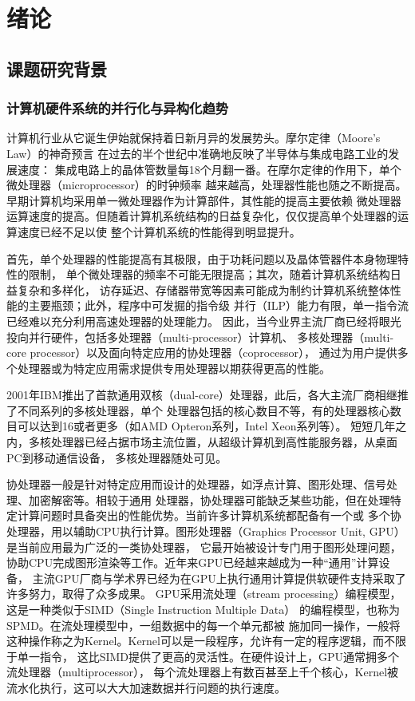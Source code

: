 \chapter{绪论}

\section{课题研究背景}

\subsection{计算机硬件系统的并行化与异构化趋势}
计算机行业从它诞生伊始就保持着日新月异的发展势头。摩尔定律（Moore's Law）的神奇预言
在过去的半个世纪中准确地反映了半导体与集成电路工业的发展速度：
集成电路上的晶体管数量每18个月翻一番。在摩尔定律的作用下，单个微处理器（microprocessor）的时钟频率
越来越高，处理器性能也随之不断提高。早期计算机均采用单一微处理器作为计算部件，其性能的提高主要依赖
微处理器运算速度的提高。但随着计算机系统结构的日益复杂化，仅仅提高单个处理器的运算速度已经不足以使
整个计算机系统的性能得到明显提升。

首先，单个处理器的性能提高有其极限，由于功耗问题以及晶体管器件本身物理特性的限制，
单个微处理器的频率不可能无限提高；其次，随着计算机系统结构日益复杂和多样化，
访存延迟、存储器带宽等因素可能成为制约计算机系统整体性能的主要瓶颈；此外，程序中可发掘的指令级
并行（ILP）能力有限，单一指令流已经难以充分利用高速处理器的处理能力。
因此，当今业界主流厂商已经将眼光投向并行硬件，包括多处理器（multi-processor）计算机、
多核处理器（multi-core processor）以及面向特定应用的协处理器（coprocessor），
通过为用户提供多个处理器或为特定应用需求提供专用处理器以期获得更高的性能。

2001年IBM推出了首款通用双核（dual-core）处理器，此后，各大主流厂商相继推了不同系列的多核处理器，单个
处理器包括的核心数目不等，有的处理器核心数目可以达到16或者更多（如AMD Opteron系列，Intel Xeon系列等）。
短短几年之内，多核处理器已经占据市场主流位置，从超级计算机到高性能服务器，从桌面PC到移动通信设备，
多核处理器随处可见。

协处理器一般是针对特定应用而设计的处理器，如浮点计算、图形处理、信号处理、加密解密等。相较于通用
处理器，协处理器可能缺乏某些功能，但在处理特定计算问题时具备突出的性能优势。当前许多计算机系统都配备有一个或
多个协处理器，用以辅助CPU执行计算。图形处理器（Graphics Processor Unit, GPU）是当前应用最为广泛的一类协处理器，
它最开始被设计专门用于图形处理问题，协助CPU完成图形渲染等工作。近年来GPU已经越来越成为一种“通用”计算设备，
主流GPU厂商与学术界已经为在GPU上执行通用计算提供软硬件支持采取了许多努力，取得了众多成果。
GPU采用流处理（stream processing）编程模型，这是一种类似于SIMD（Single Instruction Multiple Data）
的编程模型，也称为SPMD。在流处理模型中，一组数据中的每一个单元都被
施加同一操作，一般将这种操作称之为Kernel。Kernel可以是一段程序，允许有一定的程序逻辑，而不限于单一指令，
这比SIMD提供了更高的灵活性。在硬件设计上，GPU通常拥多个流处理器（multiprocessor），
每个流处理器上有数百甚至上千个核心，Kernel被流水化执行，这可以大大加速数据并行问题的执行速度。

